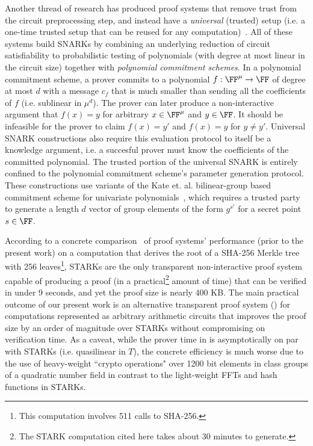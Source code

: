 Another thread of research has produced proof systems that remove trust from the circuit preprocessing step, and instead have a \emph{universal} (trusted) setup (i.e. a one-time trusted setup that can be reused for any computation)~\cite{Sonic, Libra, Spartan, Plonk}. All of these systems build SNARKs by combining an underlying reduction of circuit satisfiability to probabilistic testing of polynomials (with degree at most linear in the circuit size) together with \emph{polynomial commitment schemes}. In a polynomial commitment scheme, a prover commits to a polynomial $f: \FF^\mu \rightarrow \FF$ of degree at most $d$ with a message $c_f$ that is much smaller than sending all the coefficients of $f$ (i.e. sublinear in $\mu^d$). The prover can later produce a non-interactive argument that $f(x) = y$ for arbitrary $x \in \FF^\mu$ and $y \in \FF$. It should be infeasible for the prover to claim $f(x) = y'$ and $f(x) = y$ for $y \neq y'$. Universal SNARK constructions also require this evaluation protocol to itself be a knowledge argument, i.e. a succesful prover must know the coefficients of the committed polynomial. The trusted portion of the universal SNARK is entirely confined to the polynomial commitment scheme's parameter generation protocol. These constructions use variants of the Kate et. al. bilinear-group based commitment scheme for univariate polynomials~\cite{AC:KatZavGol10}, which requires a trusted party to generate a length $d$ vector of group elements of the form $g^{s^i}$ for a secret point $s \in \FF$. 

According to a concrete comparison~\cite{Libra} of proof systems' performance (prior to the present work) on a computation that derives the root of a SHA-256 Merkle tree with 256 leaves\footnote{This computation involves 511 calls to SHA-256.}, STARKs are the only transparent non-interactive proof system capable of producing a proof (in a practical\footnote{The STARK computation cited here takes about 30 minutes to generate.}  amount of time) that can be verified in under 9 seconds, and yet the proof size is nearly 400 KB. The main practical outcome of our present work is an alternative transparent proof system () for computations represented as arbitrary arithmetic circuits that improves the proof size by an order of magnitude over STARKs without compromising on verification time. As a caveat, while the prover time in  is asymptotically on par with STARKs (i.e. quasilinear in $T$), the concrete efficiency is much worse due to the use of heavy-weight ``crypto operations" over 1200 bit elements in class groups of a quadratic number field in contrast to the light-weight FFTs and hash functions in STARKs. 

